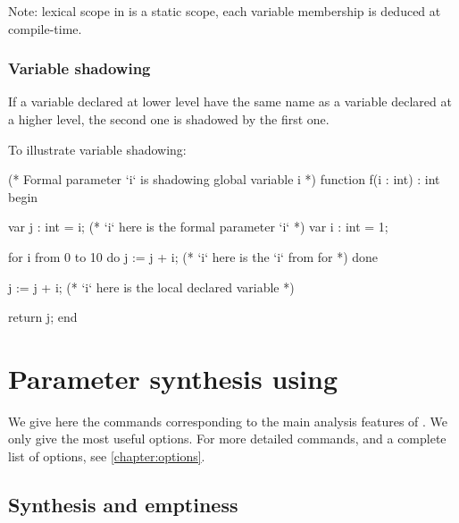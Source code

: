 Note: lexical scope in \imitator{} is a static scope, each variable membership is deduced at compile-time.

\subsection{Variable shadowing}

If a variable declared at lower level have the same name as a variable declared at a higher level, the second one is shadowed by the first one.

\begin{example}
	To illustrate variable shadowing:

\begin{IMITATORmodel}
(* Formal parameter `i` is shadowing global variable i *)
function f(i : int) : int
begin

	var j : int = i; (* `i` here is the formal parameter `i` *)
	var i : int = 1;

	for i from 0 to 10 do
		j := j + i; (* `i` here is the `i` from for *)
	done

	j := j + i; (* `i` here is the local declared variable *)

	return j;
end
\end{IMITATORmodel}
\end{example}

\chapter{Parameter synthesis using \imitator{}}


We give here the commands corresponding to the main analysis features of \imitator{}.
We only give the most useful options.
For more detailed commands, and a complete list of options, see \cref{chapter:options}.

\section{Synthesis and emptiness}

